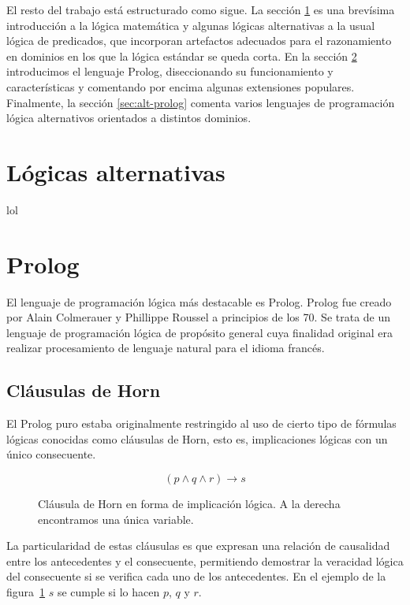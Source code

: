 \documentclass[11pt,captions=nooneline,DIV=14, parskip=full]{scrartcl}
\begin{document}
El resto del trabajo está estructurado como sigue. La sección \ref{sec:alt-logic} es una brevísima introducción a la lógica matemática y algunas lógicas alternativas a la usual lógica de predicados, que incorporan artefactos adecuados para el razonamiento en dominios en los que la lógica estándar se queda corta. En la sección \ref{sec:prolog} introducimos el lenguaje Prolog, diseccionando su funcionamiento y características y comentando por encima algunas extensiones populares. Finalmente, la sección \ref{sec:alt-prolog} comenta varios lenguajes de programación lógica alternativos orientados a distintos dominios.

\section{Lógicas alternativas}
\label{sec:alt-logic}
lol

\section{Prolog}
\label{sec:prolog}

El lenguaje de programación lógica más destacable es Prolog. Prolog fue creado por Alain Colmerauer y Phillippe Roussel a principios de los 70. Se trata de un lenguaje de programación lógica de propósito general cuya finalidad original era realizar procesamiento de lenguaje natural para el idioma francés.

\subsection{Cláusulas de Horn}
\label{subsec:horn}
El Prolog puro estaba originalmente restringido al uso de cierto tipo de fórmulas lógicas conocidas como cláusulas de Horn, esto es, implicaciones lógicas con un único consecuente.

\begin{figure}[h]
\label{fig:horn}
{\Large{\[ ( p \land q \land r ) \to s \]}}%
\caption{Cláusula de Horn en forma de implicación lógica. A la derecha encontramos una única variable.}
\end{figure}

La particularidad de estas cláusulas es que expresan una relación de causalidad entre los antecedentes y el consecuente, permitiendo demostrar la veracidad lógica del consecuente si se verifica cada uno de los antecedentes. En el ejemplo de la figura~\ref{fig:horn} $ s $ se cumple si lo hacen $ p $, $ q $ y $r $.
\end{document}
